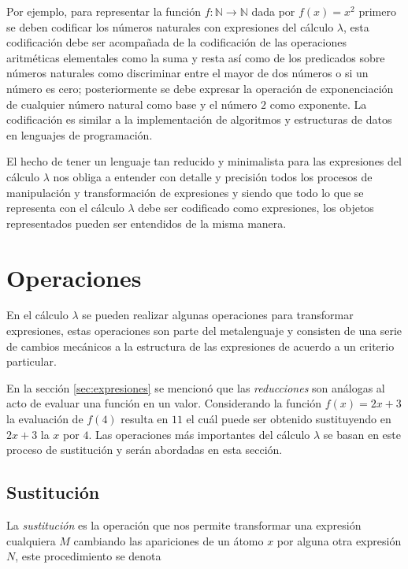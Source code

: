 Por ejemplo, para representar la función \( f \colon \mathbb{N} \to \mathbb{N} \) dada por \( f(x)=x^{2} \) primero se deben codificar los números naturales con expresiones del cálculo \( λ \), esta codificación debe ser acompañada de la codificación de las operaciones aritméticas elementales como la suma y resta así como de los predicados sobre números naturales como discriminar entre el mayor de dos números o si un número es cero; posteriormente se debe expresar la operación de exponenciación de cualquier número natural como base y el número \( 2 \) como exponente. La codificación es similar a la implementación de algoritmos y estructuras de datos en lenguajes de programación.

El hecho de tener un lenguaje tan reducido y minimalista para las expresiones del cálculo \( λ \) nos obliga a entender con detalle y precisión todos los procesos de manipulación y transformación de expresiones y siendo que todo lo que se representa con el cálculo \( λ \) debe ser codificado como expresiones, los objetos representados pueden ser entendidos de la misma manera.

\section{Operaciones}
\label{sec:operaciones}

En el cálculo \( λ \) se pueden realizar algunas operaciones para transformar expresiones, estas operaciones son parte del metalenguaje y consisten de una serie de cambios mecánicos a la estructura de las expresiones de acuerdo a un criterio particular.

En la sección \ref{sec:expresiones} se mencionó que las \emph{reducciones} son análogas al acto de evaluar una función en un valor. Considerando la función \( f(x) = 2x+3 \) la evaluación de \( f(4) \) resulta en \( 11 \) el cuál puede ser obtenido sustituyendo en \( 2x+3 \) la \( x \) por \( 4 \). Las operaciones más importantes del cálculo \( λ \) se basan en este proceso de sustitución y serán abordadas en esta sección.

\subsection{Sustitución}
\label{sec:op-sustitucion}

La \emph{sustitución} es la operación que nos permite transformar una expresión cualquiera \( M \) cambiando las apariciones de un átomo \( x \) por alguna otra expresión \( N \), este procedimiento se denota

